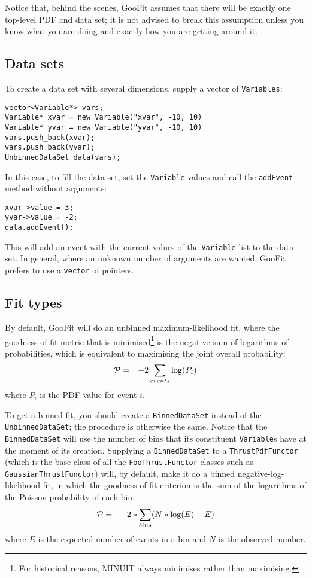 \documentclass[12pt,pdflatex]{article}
\begin{document}
Notice that, behind the scenes, GooFit assumes that there
will be exactly one top-level PDF and data set; it is not
advised to break this assumption unless you know what you
are doing and exactly how you are getting around it. 

\subsection{Data sets}

To create a data set with several dimensions, supply a vector
of \texttt{Variables}:
\begin{verbatim}
vector<Variable*> vars;
Variable* xvar = new Variable("xvar", -10, 10)
Variable* yvar = new Variable("yvar", -10, 10)
vars.push_back(xvar);
vars.push_back(yvar);
UnbinnedDataSet data(vars);
\end{verbatim}
In this case, to fill the data set, set the \texttt{Variable}
values and call the \texttt{addEvent} method without arguments:
\begin{verbatim}
xvar->value = 3;
yvar->value = -2;
data.addEvent();
\end{verbatim}
This will add an event with the current values of the \texttt{Variable}
list to the data set. In general, where an unknown number of arguments
are wanted, GooFit prefers to use a \texttt{vector} of pointers. 

\subsection{Fit types} 

By default, GooFit will do an unbinned maximum-likelihood fit, where
the goodness-of-fit metric that is minimised\footnote{For historical reasons, 
MINUIT always minimises rather than maximising.} is 
the negative sum of logarithms of 
probabilities, which is equivalent to maximising the joint
overall probability: 
\begin{eqnarray}
{\cal P} &=& -2\sum\limits_{events} \log(P_i)
\end{eqnarray}
where $P_i$ is the PDF value for event $i$. 

To get a binned fit, you should create a \texttt{BinnedDataSet} instead of the
\texttt{UnbinnedDataSet}; the procedure is otherwise the same. Notice that
the \texttt{BinnedDataSet} will use the number of bins that its constituent
\texttt{Variable}s have at the moment of its creation. Supplying a \texttt{BinnedDataSet}
to a \texttt{Thrust\-Pdf\-Functor} (which is the base class of all the \texttt{FooThrustFunctor}
classes such as \texttt{GaussianThrustFunctor}) will, by default, make it
do a binned negative-log-likelihood fit, in which the goodness-of-fit criterion
is the sum of the logarithms of the Poisson probability of each bin:
\begin{eqnarray}
{\cal P} &=& -2*\sum\limits_{bins}(N * \log(E) - E)
\end{eqnarray}
where $E$ is the expected number of events in a bin and $N$ is
the observed number. 
\end{document}
